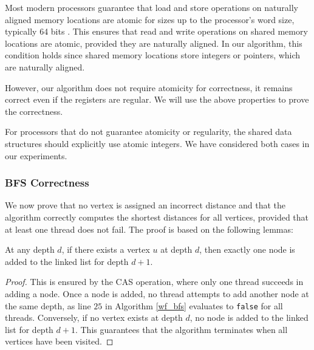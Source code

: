 Most modern processors guarantee that load and store operations on naturally aligned memory locations are atomic for sizes up to the processor's word size, typically 64 bits \cite{amdmanual} \cite{intelmanual}. This ensures that read and write operations on shared memory locations are atomic, provided they are naturally aligned. In our algorithm, this condition holds since shared memory locations store integers or pointers, which are naturally aligned.

However, our algorithm does not require atomicity for correctness, it remains correct even if the registers are regular. We will use the above properties to prove the correctness.

For processors that do not guarantee atomicity or regularity, the shared data structures should explicitly use atomic integers. We have considered both cases in our experiments.

\subsubsection{BFS Correctness}

We now prove that no vertex is assigned an incorrect distance and that the algorithm correctly computes the shortest distances for all vertices, provided that at least one thread does not fail. The proof is based on the following lemmas:

\begin{lemma}
\label{lem:1}
At any depth $d$, if there exists a vertex $u$ at depth $d$, then exactly one node is added to the linked list for depth $d+1$.
\end{lemma}
\begin{proof}
This is ensured by the CAS operation, where only one thread succeeds in adding a node. Once a node is added, no thread attempts to add another node at the same depth, as line $25$ in Algorithm \ref{wf_bfs} evaluates to \texttt{false} for all threads. Conversely, if no vertex exists at depth $d$, no node is added to the linked list for depth $d+1$. This guarantees that the algorithm terminates when all vertices have been visited.
\end{proof}

